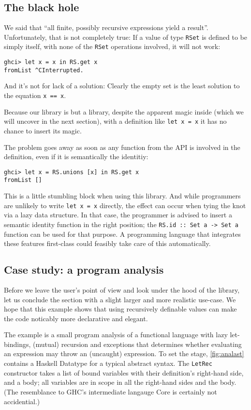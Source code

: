 \documentclass[manuscript,screen,acmsmall]{acmart}
\begin{document}
\subsection{The black hole}\label{sec:blackhole}

We said that “all finite, possibly recursive expressions yield a result”. Unfortunately, that is not completely true: If a value of type \verb|RSet| is defined to be simply itself, with none of the \verb|RSet| operations involved, it will not work:
\begin{verbatim}
ghci> let x = x in RS.get x
fromList ^CInterrupted.
\end{verbatim}
And it’s not for lack of a solution: Clearly the empty set is the least solution to the equation \verb|x == x|.

Because our library is but a library, despite the apparent magic inside (which we will uncover in the next section), with a definition like \verb|let x = x| it has no chance to insert its magic.

The problem goes away as soon as any function from the API is involved in the definition, even if it is semantically the identitiy:
\begin{verbatim}
ghci> let x = RS.unions [x] in RS.get x
fromList []
\end{verbatim}

This is a little stumbling block when using this library. And while programmers are unlikely to write \verb|let x = x| directly, the effect can occur when tying the knot via a lazy data structure. In that case, the programmer is advised to insert a semantic identity function in the right position; the \verb|RS.id :: Set a -> Set a| function can be used for that purpose.
A programming language that integrates these features first-class could feasibly take care of this automatically.

\subsection{Case study: a program analysis}

Before we leave the user's point of view and look under the hood of the library, let us conclude the section with a slight larger and more realistic use-case. We hope that this example shows that using recursively definable values can make the code noticably more declarative and elegant.

The example is a small program analysis of a functional language with lazy let-bindings, (mutual) recursion and exceptions that determines whether evaluating an expression may throw an (uncaught) expression. To set the stage, \cref{fig:analast} contains a Haskell Datatype for a typical abstract syntax. The \verb|LetRec| constructor takes a list of bound variables with their definition's  right-hand side, and a body; all variables are in scope in all the right-hand sides and the body.
(The resemblance to GHC's intermediate langauge Core \citep{secrets} is certainly not accidential.)
\end{document}
